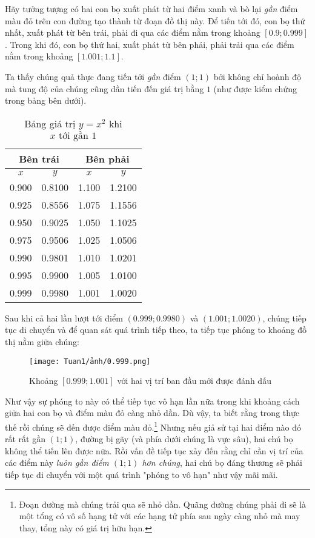 Hãy tưởng tượng có hai con bọ xuất phát từ hai điểm xanh và bò lại \emph{gần} điểm màu đỏ trên con đường tạo thành từ đoạn đồ thị này. Để tiến tới đó, con bọ thứ nhất, xuất phát từ bên trái, phải đi qua các điểm nằm trong khoảng $[0.9;0.999]$. Trong khi đó, con bọ thứ hai, xuất phát từ bên phải, phải trải qua các điểm nằm trong khoảng $[1.001;1.1]$.

Ta thấy chúng quả thực đang tiến tới \emph{gần} điểm $(1;1)$ bởi không chỉ hoành độ mà tung độ của chúng cũng dần tiến đến giá trị bằng $1$ (như được kiểm chứng trong bảng bên dưới).
\begin{table}[H]
    \centering
    \caption{Bảng giá trị \( y = x^2 \) khi \( x \text{~tới gần } 1 \)}
    \begin{tabular}{|c|c||c|c|}
    \hline
    \multicolumn{2}{|c||}{Bên trái} & \multicolumn{2}{c|}{Bên phải} \\
    \hline
    \( x \) & \( y \) & \( x \) & \( y \) \\
    \hline
    0.900 & 0.8100 & 1.100 & 1.2100 \\
    0.925 & 0.8556 & 1.075 & 1.1556 \\
    0.950 & 0.9025 & 1.050 & 1.1025 \\
    0.975 & 0.9506 & 1.025 & 1.0506 \\
    0.990 & 0.9801 & 1.010 & 1.0201 \\
    0.995 & 0.9900 & 1.005 & 1.0100 \\
    0.999 & 0.9980 & 1.001 & 1.0020 \\
    \hline
    \end{tabular}
\end{table}
   
Sau khi cả hai lần lượt tới điểm $(0.999;0.9980)$ và $(1.001;1.0020)$, chúng tiếp tục di chuyển và để quan sát quá trình tiếp theo, ta tiếp tục phóng to khoảng đồ thị nằm giữa chúng:
\begin{figure}[h!]
    \centering
    \texttt{[image: Tuan1/ảnh/0.999.png]}
    \caption{Khoảng \([0.999;1.001]\) với hai vị trí ban đầu mới được đánh dấu }
\end{figure}

Như vậy sự phóng to này có thể tiếp tục vô hạn lần nữa trong khi khoảng cách giữa hai con bọ và điểm màu đỏ càng nhỏ dần. Dù vậy, ta biết rằng trong thực thế rồi chúng sẽ đến được điểm màu đỏ.\footnote{Đoạn đường mà chúng trải qua sẽ nhỏ dần. Quãng đường chúng phải đi sẽ là một tổng có vô số hạng tử với các hạng tử phía sau ngày càng nhỏ mà may thay, tổng này có giá trị hữu hạn. }\newline
Nhưng nếu giả sử tại hai điểm nào đó rất rất gần $(1;1)$, đường bị gãy (và phía dưới chúng là vực sâu), hai chú bọ không thể tiến lên được nữa. Rồi vấn đề tiếp tục xảy đến rằng chỉ cần vị trí của các điểm này \emph{luôn gần điểm $(1;1)$ hơn chúng}, hai chú bọ đáng thương sẽ phải tiếp tục di chuyển với một quá trình "phóng to vô hạn" như vậy mãi mãi.

